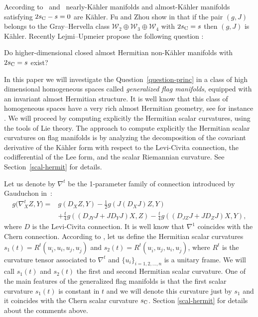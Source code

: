 \documentclass[10pt,a4paper]{amsart}
\numberwithin{equation}{section}
\begin{document}
According to~\cite{apo} and~\cite{integra} nearly-K\"ahler manifolds and almost-K\"ahler manifolds satisfying $2s_{\rm C}-s=0$ are K\"ahler. Fu and Zhou show in \cite{fu} that if the pair $(g,J)$ belongs to the Gray--Hervella class $\mathcal{W}_{2}\oplus \mathcal{W}_{3}\oplus \mathcal{W}_{4}$ with $2s_{\rm C}=s$ then $(g,J)$ is K\"ahler. Recently Lejmi--Upmeier propose the following question \cite[Remark~3.3]{integra}:
\begin{Question} \label{question-princ}
Do higher-dimensional closed almost Hermitian non-K\"ahler manifolds with $2s_{\rm C}=s$ exist?
\end{Question}

In this paper we will investigate the Question~\ref{question-princ} in a class of high dimensional homogeneous spaces called {\it generalized flag manifolds}, equipped with an invariant almost Hermitian structure. It is well know that this class of homogeneous spaces have a very rich almost Hermitian geometry, see for instance \cite{rita, sn}. We will proceed by computing explicitly the Hermitian scalar curvatures, using the tools of Lie theory. The approach to compute explicitly the Hermitian scalar curvatures on flag manifolds is by analyzing the decomposition of the covariant derivative of the K\"ahler form with respect to the Levi-Civita connection, the codifferential of the Lee form, and the scalar Riemannian curvature. See Section~\ref{scal-hermit} for details.

Let us denote by $\nabla^t$ be the 1-parameter family of connection introduced by Gauduchon in~\cite{gau}:
\begin{align*}
g\big(\nabla^{t}_{X}Z,Y\big)={}&g(D_{X}Z,Y)-\frac{1}{2}g(J(D_{X}J)Z,Y)
\\
&+\frac{t}{4}g((D_{JY}J+JD_{Y}J)X,Z)-\frac{t}{4}g((D_{JZ}J+JD_{Z}J)X,Y),
\end{align*}
where $D$ is the Levi-Civita connection.
 It is well know that $\nabla^1$ coincides with the Chern connection.
 According to \cite{fu}, let us define the Hermitian scalar curvatures $s_{1}(t)=R^{t}(u_{\overline{i}},u_{i},u_{j},u_{\overline{j}})$
and $s_{2}(t)=R^{t}(u_{\overline{i}},u_{j},u_{i},u_{\overline{j}})$,
where $R^{t}$ is the curvature tensor associated to $\nabla^{t}$ and $\{u_{i}\}_{i=1,2,\dots,n}$ is a unitary frame. We will call $s_1(t)$ and $s_2(t)$ the first and second Hermitian scalar curvature. One of the main features of the generalized flag manifolds is that the first scalar curvature $s_1(t)$ is constant in $t$ and we will denote this curvature just by $s_1$ and it coincides with the Chern scalar curvature $s_{\rm C}$. Section \ref{scal-hermit} for details about the comments above.
\end{document}
